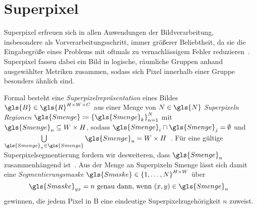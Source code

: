 \section{Superpixel}
\label{superpixel}

Superpixel erfreuen sich in allen Anwendungen der Bildverarbeitung, insbesondere als Vorverarbeitungsschritt, immer größerer Beliebtheit, da sie die Eingabegröße eines Problems mit oftmals zu vernachlässigem Fehler reduzieren~\cite{Gadde}.
Superpixel fassen dabei ein Bild in logische, räumliche Gruppen anhand ausgewählter Metriken zusammen, sodass sich Pixel innerhalb einer Gruppe besonders ähnlich sind.

Formal besteht eine \emph{Superpixelrepräsentation} eines Bildes $\gls{B} \in \gls{R}^{H \times W \times C}$ aus einer Menge von $N \in \gls{N}$ \emph{Superpixeln} \bzw{} \emph{Regionen} $\gls{Smenge} \coloneqq {\left\{\gls{Smenge}_k\right\}}_{n=1}^N$ mit $\gls{Smenge}_n \subseteq W \times H$, sodass $\gls{Smenge}_i \cap \gls{Smenge}_j = \emptyset$ und $\bigcup\limits_{\gls{Smenge}_n \in \gls{Smenge}} \gls{Smenge}_n = W \times H$~\cite{super}.
Für eine gültige Superpixelsegmentierung fordern wir desweiteren, dass $\gls{Smenge}_n$ zusammenhängend ist~\cite{super}.
Aus der Menge an Superpixeln \gls{Smenge} lässt sich damit eine \emph{Segmentierungsmaske} $\gls{Smaske} \in {\left\{1, \ldots, N\right\}}^{H \times W}$ über
\begin{equation*}
  \gls{Smaske}_{yx} = n\,\, \text{\gdw{} } \left(x,y\right) \in \gls{Smenge}_n
\end{equation*}
gewinnen, die jedem Pixel in \gls{B} eine eindeutige Superpixelzugehörigkeit $n$ zuweist.

